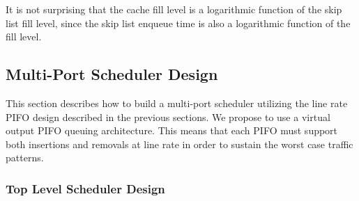 It is not surprising that the cache fill level is a logarithmic function of the skip list fill level, since the skip list enqueue time is also a logarithmic function of the fill level.

\subsection{Multi-Port Scheduler Design}\label{sec:sched-des}

This section describes how to build a multi-port scheduler utilizing the line rate PIFO design described in the previous sections. We propose to use a virtual output PIFO queuing architecture. This means that each PIFO must support both insertions and removals at line rate in order to sustain the worst case traffic patterns. 




\subsubsection{Top Level Scheduler Design}\label{sec:top-level-sched}

